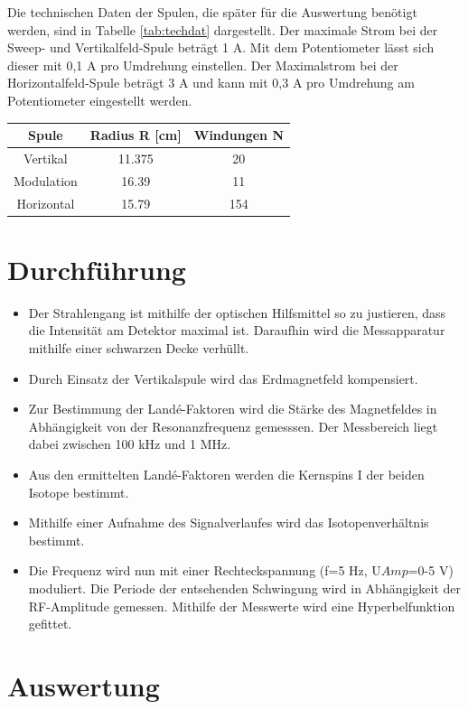 \documentclass[]{scrartcl}
\begin{document}
Die technischen Daten der Spulen, die später für die Auswertung benötigt werden, sind in Tabelle \ref{tab:techdat} dargestellt. Der maximale Strom bei der Sweep- und Vertikalfeld-Spule beträgt 1 A. Mit dem Potentiometer lässt sich dieser mit 0,1 A pro Umdrehung einstellen. Der Maximalstrom bei der Horizontalfeld-Spule beträgt 3 A und kann mit 0,3 A pro Umdrehung am Potentiometer eingestellt werden.
\begin{center}
	\begin{tabular}{|c|c|c|}
		\hline Spule & Radius R [cm] & Windungen N \\
		\hline Vertikal & 11.375 & 20 \\
		\hline Modulation & 16.39 & 11 \\
		\hline Horizontal & 15.79 & 154 \\
		\hline
	\end{tabular}
\label{tab:techdat}
\end{center}

\section{Durchführung}
\begin{itemize}
	\item Der Strahlengang ist mithilfe der optischen Hilfsmittel so zu justieren, dass die Intensität am Detektor maximal ist. Daraufhin wird die Messapparatur mithilfe einer schwarzen Decke verhüllt. 
	\item Durch Einsatz der Vertikalspule wird das Erdmagnetfeld kompensiert. 
	\item Zur Bestimmung der Landé-Faktoren wird die Stärke des Magnetfeldes in Abhängigkeit von der Resonanzfrequenz gemesssen. Der Messbereich liegt dabei zwischen 100 kHz und 1 MHz.
	\item Aus den ermittelten Landé-Faktoren werden die Kernspins I der beiden Isotope bestimmt. 
	\item Mithilfe einer Aufnahme des Signalverlaufes wird das Isotopenverhältnis bestimmt.
	\item Die Frequenz wird nun mit einer Rechteckspannung (f=5 Hz, U${Amp}$=0-5 V) moduliert. Die Periode der entsehenden Schwingung wird in Abhängigkeit der RF-Amplitude gemessen. Mithilfe der Messwerte wird eine Hyperbelfunktion gefittet.
\end{itemize}

\section{Auswertung}
\end{document}

